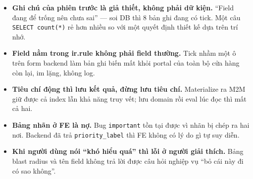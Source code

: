 \begin{itemize}
  \item \textbf{Ghi chú của phiên trước là giả thiết, không phải dữ kiện.} ``Field đang để trống nên
    chưa sai'' --- soi DB thì 8 bản ghi đang có tick. Một câu \texttt{SELECT count(*)} rẻ hơn nhiều
    so với một quyết định thiết kế dựa trên trí nhớ.
  \item \textbf{Field nằm trong ir.rule không phải field thường.} Tick nhầm một ô trên form backend
    làm bản ghi biến mất khỏi portal của toàn bộ cửa hàng còn lại, im lặng, không log.
  \item \textbf{Tiêu chí động thì lưu kết quả, đừng lưu tiêu chí.} Materialize ra M2M giữ được cả
    index lẫn khả năng truy vết; lưu domain rồi eval lúc đọc thì mất cả hai.
  \item \textbf{Bảng nhãn ở FE là nợ.} Bug \texttt{important} tồn tại được vì nhãn bị chép ra hai
    nơi. Backend đã trả \texttt{priority\_label} thì FE không có lý do gì tự suy diễn.
  \item \textbf{Khi người dùng nói ``khó hiểu quá'' thì lỗi ở người giải thích.} Bảng blast radius và
    tên field không trả lời được câu hỏi nghiệp vụ ``bỏ cái này đi có sao không''.
\end{itemize}
